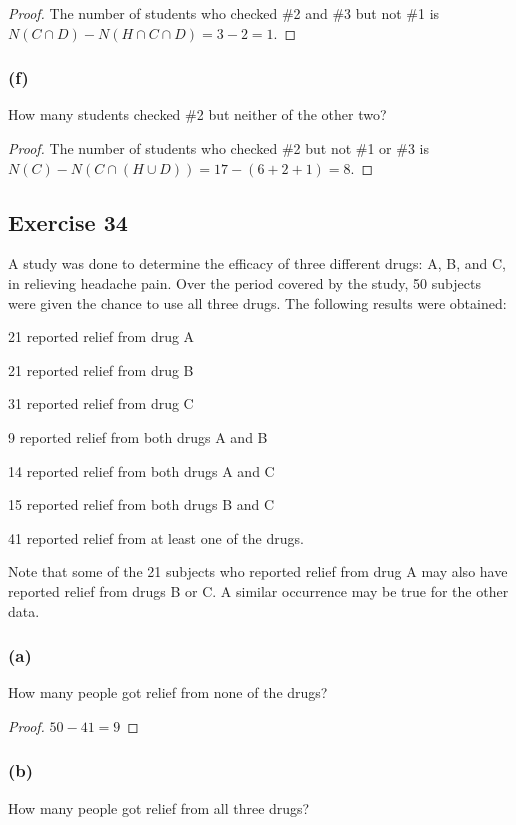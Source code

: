 \documentclass[14pt]{extarticle}
\begin{document}
\begin{proof}
The number of students who checked \#2 and \#3 but not \#1 is \(N(C \cap D) - N(H \cap C \cap D) = 3 - 2 = 1\).
\end{proof}

\subsubsection{(f)}
How many students checked \#2 but neither of the other two?

\begin{proof}
The number of students who checked \#2 but not \#1 or \#3 is \(N(C) - N(C \cap (H \cup D)) = 17 - (6+2+1) = 8\).
\end{proof}

\subsection{Exercise 34}
A study was done to determine the efficacy of three different drugs: A, B, and C, in relieving headache pain. 
Over the period covered by the study, 50 subjects were given the chance to use all three drugs. The following 
results were obtained: 

21 reported relief from drug A

21 reported relief from drug B

31 reported relief from drug C

9 reported relief from both drugs A and B

14 reported relief from both drugs A and C

15 reported relief from both drugs B and C

41 reported relief from at least one of the drugs.

Note that some of the 21 subjects who reported relief from drug A may also have reported relief from drugs B or C. A 
similar occurrence may be true for the other data.

\subsubsection{(a)}
How many people got relief from none of the drugs?

\begin{proof}
\(50-41=9\)
\end{proof}

\subsubsection{(b)}
How many people got relief from all three drugs?
\end{document}
